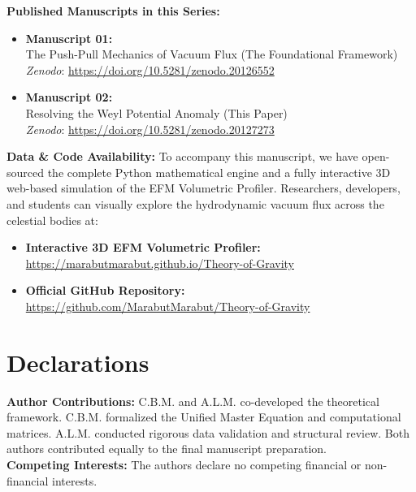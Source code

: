 \documentclass[11pt, a4paper]{article}
\begin{document}
  \vspace{1em}
  \noindent \textbf{Published Manuscripts in this Series:}
  \begin{itemize}
    \item \textbf{Manuscript 01:} \\ The Push-Pull Mechanics of Vacuum Flux (The Foundational Framework) \\ \textit{Zenodo}: \url{https://doi.org/10.5281/zenodo.20126552}
    
    \item \textbf{Manuscript 02:} \\ Resolving the Weyl Potential Anomaly (This Paper) \\ \textit{Zenodo}: \url{https://doi.org/10.5281/zenodo.20127273}
  \end{itemize}

  \vspace{1em}
  \noindent \textbf{Data \& Code Availability:} To accompany this manuscript, we have open-sourced the complete Python mathematical engine and a fully interactive 3D web-based simulation of the EFM Volumetric Profiler. Researchers, developers, and students can visually explore the hydrodynamic vacuum flux across the celestial bodies at: 
  \begin{itemize}
    \item \textbf{Interactive 3D EFM Volumetric Profiler:} \\ \url{https://marabutmarabut.github.io/Theory-of-Gravity}
    \item \textbf{Official GitHub Repository:} \\ \url{https://github.com/MarabutMarabut/Theory-of-Gravity}
  \end{itemize}

\clearpage
\section*{Declarations}
\textbf{Author Contributions:} C.B.M. and A.L.M. co-developed the theoretical framework. C.B.M. formalized the Unified Master Equation and computational matrices. A.L.M. conducted rigorous data validation and structural review. Both authors contributed equally to the final manuscript preparation. \\[0.5em]
\textbf{Competing Interests:} The authors declare no competing financial or non-financial interests.
\end{document}
